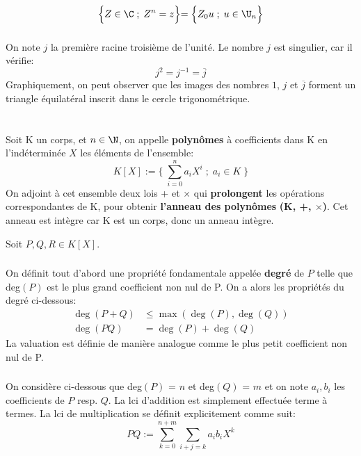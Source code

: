 \[
   \Bigl\{ Z \in \C \; ; \; Z^n = z \Bigl\} = \Bigl\{ Z_0u \; ; \; u \in \U_n \Bigl\}   
\]
\subsection*{}
On note \(j\) la première racine troisième de l'unité.
Le nombre \(j\) est singulier, car il vérifie:
\[
   j^2 = j^{-1} = \overline{j}
\]
Graphiquement, on peut observer que les images des nombres \(1\), \(j\) et \(\overline{j}\) forment un triangle équilatéral inscrit dans le cercle trigonométrique.

\chapter*{}
Soit K un corps, et \(n \in \N\), on appelle \textbf{polynômes} à coefficients dans K en l'indéterminée \(X\) les éléments de l'ensemble:
\[
   K[X] := \Biggl\{ \; \sum_{i=0}^n a_{i}X^{i} \; ; \; a_i \in K \;\Biggl\}
\]
On adjoint à cet ensemble deux lois + et \(\times\) qui \textbf{prolongent} les opérations correspondantes de K, pour obtenir \textbf{l'anneau des polynômes} \textbf{(K, +, \(\times\))}. Cet anneau est intègre car K est un corps, donc un anneau intègre.\<

Soit \(P, Q, R \in K[X]\).

\subsection*{}
On définit tout d'abord une propriété fondamentale appelée \textbf{degré} de \(P\) telle que deg\((P)\) est le plus grand coefficient non nul de P.
On a alors les propriétés du degré ci-dessous:
\begin{align*}
   \deg(P + Q) &\leq \max(\deg(P), \deg(Q))\\
   \deg(PQ) &= \deg(P) + \deg(Q)
\end{align*}
La valuation est définie de manière analogue comme le plus petit coefficient non nul de P.
\subsection*{}
On considère ci-dessous que deg\((P)\) = \(n\) et deg\((Q)\) = \(m\) et on note \(a_i, b_i\) les coefficients de \(P\) resp. \(Q\).\+
La lci d'addition est simplement effectuée terme à termes.\+
La lci de multiplication se définit explicitement comme suit:
\[
   PQ := \sum_{k=0}^{n+m}\sum_{i+j = k} a_{i}b_{i}X^{k}
\]

